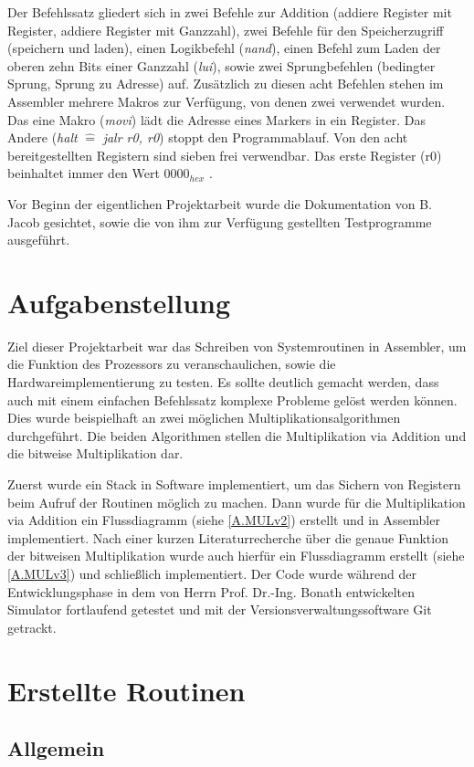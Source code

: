 \documentclass[fleqn, a4paper, 11pt]{article}       %
\begin{document}
Der Befehlssatz gliedert sich in zwei Befehle zur Addition (addiere Register mit Register, addiere Register mit Ganzzahl), zwei Befehle für den Speicherzugriff (speichern und laden), einen Logikbefehl (\emph{nand}), einen Befehl zum Laden der oberen zehn Bits einer Ganzzahl (\emph{lui}), sowie zwei Sprungbefehlen (bedingter Sprung, Sprung zu Adresse) auf. Zusätzlich zu diesen acht Befehlen stehen im Assembler mehrere Makros zur Verfügung, von denen zwei verwendet wurden. Das eine Makro (\emph{movi}) lädt die Adresse eines Markers in ein Register. Das Andere (\emph{halt} $\widehat{=}$ \emph{jalr r0, r0}) stoppt den Programmablauf. Von den acht bereitgestellten Registern sind sieben frei verwendbar. Das erste Register (r0) beinhaltet immer den Wert $0000_{hex}$ \cite[1]{JACOBInstr}.

Vor Beginn der eigentlichen Projektarbeit wurde die Dokumentation von B. Jacob gesichtet, sowie die von ihm zur Verfügung gestellten Testprogramme ausgeführt.


\section{Aufgabenstellung}
Ziel dieser Projektarbeit war das Schreiben von Systemroutinen in Assembler, um die Funktion des Prozessors zu veranschaulichen, sowie die Hardwareimplementierung zu testen. Es sollte deutlich gemacht werden, dass auch mit einem einfachen Befehlssatz komplexe Probleme gelöst werden können. Dies wurde beispielhaft an zwei möglichen Multiplikationsalgorithmen durchgeführt. Die beiden Algorithmen stellen die Multiplikation via Addition und die bitweise Multiplikation dar. 

Zuerst wurde ein Stack in Software implementiert, um das Sichern von Registern beim Aufruf der Routinen möglich zu machen. Dann wurde für die Multiplikation via Addition ein Flussdiagramm (siehe \ref{A.MULv2}) erstellt und in Assembler implementiert. Nach einer kurzen Literaturrecherche über die genaue Funktion der bitweisen Multiplikation wurde auch hierfür ein Flussdiagramm erstellt (siehe \ref{A.MULv3}) und schließlich implementiert. Der Code wurde während der Entwicklungsphase in dem von Herrn Prof. Dr.-Ing. Bonath entwickelten Simulator fortlaufend getestet und mit der Versionsverwaltungssoftware Git getrackt.

\section{Erstellte Routinen}
\subsection{Allgemein}
\end{document}
